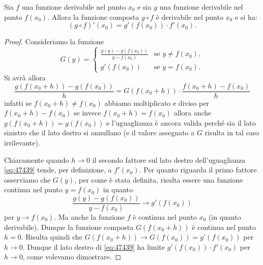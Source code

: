 \begin{theorem}
\mymark{**}%
Sia $f$ una funzione derivabile nel punto $x_0$
e sia $g$ una funzione derivabile nel punto $f(x_0)$.
Allora la funzione composta $g\circ f$ è derivabile
nel punto $x_0$ e si ha:
\[
  (g\circ f)'(x_0) = g'(f(x_0))\cdot f'(x_0).
\]
\end{theorem}
%
\begin{proof}
\mymark{**}
Consideriamo la funzione
\[
  G(y) =
  \begin{cases}
   \frac{g(y) - g(f(x_0))}{y-f(x_0)} & \text{se $y \neq f(x_0)$},\\
   g'(f(x_0)) & \text{se $y=f(x_0)$}.
  \end{cases}
\]
Si avrà allora
\begin{equation}\label{eq:47439}
 \frac{g(f(x_0+h))-g(f(x_0))}{h}
 = G(f(x_0+h)) \cdot \frac{f(x_0+h)-f(x_0)}{h}
\end{equation}
infatti se $f(x_0+h)\neq f(x_0)$ abbiamo moltiplicato e diviso
per $f(x_0+h) - f(x_0)$ se invece $f(x_0+h)=f(x_0)$ allora anche $g(f(x_0+h))=g(f(x_0))$ e l'uguaglianza è ancora valida perché sia il lato sinistro che il lato destro si annullano (e il valore assegnato a $G$ risulta in tal caso irrilevante).

Chiaramente quando $h\to 0$ il secondo fattore sul lato destro
dell'uguaglianza \eqref{eq:47439}
tende, per definizione, a $f'(x_0)$.
Per quanto riguarda il primo fattore
osserviamo che $G(y)$, per come è stata definita, risulta essere una funzione continua nel punto $y=f(x_0)$ in quanto
\[
\frac{g(y) - g(f(x_0))}{y-f(x_0)} \to g'(f(x_0))
\]
per $y\to f(x_0)$.
Ma anche la funzione $f$ è continua nel punto $x_0$ (in quanto derivabile).
Dunque la funzione composta $G(f(x_0+h))$ è continua nel punto $h=0$.
Risulta quindi che $G(f(x_0+h)) \to G(f(x_0)) = g'(f(x_0))$ per $h\to 0$.
Dunque il lato destro di \eqref{eq:47439} ha limite $g'(f(x_0)) \cdot f'(x_0)$ per $h\to 0$, come volevamo dimostrare.
\end{proof}

